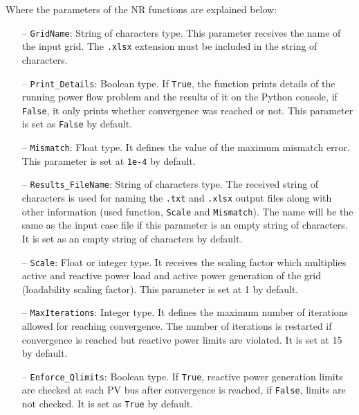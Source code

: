 \documentclass[12pt]{article}
\begin{document}
Where the parameters of the NR functions are explained below:
%
\begin{itemize}
	\item[--] \texttt{GridName}: String of characters type. This parameter receives the name of the input grid. The \texttt{.xlsx} extension must be included in the string of characters. 
	\item[--] \texttt{Print_Details}: Boolean type. If \texttt{True}, the function prints details of the running power flow problem and the results of it on the Python console, if \texttt{False}, it only prints whether convergence was reached or not. This parameter is set as \texttt{False} by default.
	\item[--] \texttt{Mismatch}: Float type. It defines the value of the maximum mismatch error. This parameter is set at \texttt{1e-4} by default.
	\item[--] \texttt{Results_FileName}: String of characters type. The received string of characters is used for naming the \texttt{.txt} and \texttt{.xlsx} output files along with other information (used function, \texttt{Scale} and \texttt{Mismatch}). The name will be the same as the input case file if this parameter is an empty string of characters. It is set as an empty string of characters by default.
	\item[--] \texttt{Scale}: Float or integer type. It receives the scaling factor which multiplies active and reactive power load and active power generation of the grid (loadability scaling factor). This parameter is set at 1 by default.
	\item[--] \texttt{MaxIterations}: Integer type. It defines the maximum number of iterations allowed for reaching convergence. The number of iterations is restarted if convergence is reached but reactive power limits are violated. It is set at 15 by default.
	\item[--] \texttt{Enforce_Qlimits}: Boolean type. If \texttt{True}, reactive power generation limits are checked at each PV bus after convergence is reached, if \texttt{False}, limits are not checked. It is set as \texttt{True} by default.
\end{itemize}
\end{document}
